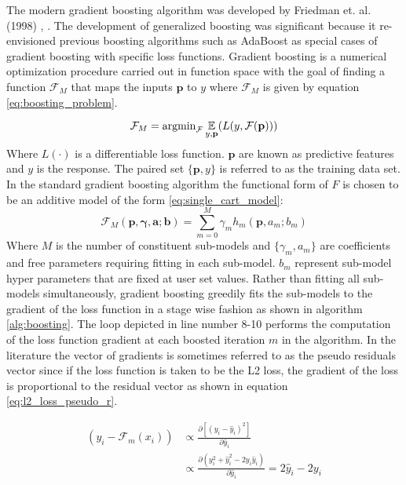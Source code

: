 The modern gradient boosting algorithm was developed by Friedman et. al. (1998) \cite{friedman1998}, \cite{friedman2001}.  The development of generalized boosting was significant because it re-envisioned previous boosting algorithms such as AdaBoost as special cases of gradient boosting with specific loss functions.  Gradient boosting is a numerical optimization procedure carried out in function space with the goal of finding a function $\mathcal F_M$ that maps the inputs $\mathbf p$ to $y$ where $\mathcal F_M$ is given by equation \ref{eq:boosting_problem}.

\begin{equation}
\mathcal F_M = \text{argmin}_{\mathcal F} \operatorname*{\mathbb{E}}_{y, \mathbf p} (L(y, \mathcal F(\mathbf p)))
\label{eq:boosting_problem}
\end{equation}
Where $L(\cdot)$ is a differentiable loss function.  $\mathbf p$ are known as predictive features and $y$ is the response.  The paired set $\{\mathbf p, y \}$ is referred to as the training data set.  In the standard gradient boosting algorithm the functional form of $F$ is chosen to be an additive model of the form \ref{eq:single_cart_model}:
\begin{equation}
\mathcal F_M(\mathbf p, \mathbf{\gamma}, \mathbf a; \mathbf b) = \sum_{m=0}^M \gamma_m h_m(\mathbf p, a_m; b_m)
\label{eq:single_cart_model}
\end{equation}
Where $M$ is the number of constituent sub-models and $\{\gamma_m, a_m\}$ are coefficients and free parameters requiring fitting in each sub-model.  $b_m$ represent sub-model hyper parameters that are fixed at user set values.
Rather than fitting all sub-models simultaneously,
gradient boosting greedily fits the sub-models to the gradient of the loss function in a stage wise fashion as shown in algorithm \ref{alg:boosting}.  The loop depicted in line number 8-10 performs the computation of the loss function gradient at each boosted iteration $m$ in the algorithm.  In the literature the vector of gradients is sometimes referred to as the pseudo residuals vector since if the loss function is taken to be the L2 loss, the gradient of the loss is proportional to the residual vector as shown in equation \ref{eq:l2_loss_pseudo_r}.

\begin{align}
    (y_i - \mathcal F_{m}(x_i)) & \propto \frac{\partial [(y_i - \hat y_i)^2]}{\partial \hat y_i} \nonumber \\
     & \propto \frac{\partial (y_i^2 + \hat y_i^2 - 2y_i \hat y_i)}{\partial \hat y_i} = 2 \hat y_i - 2 y_i
    \label{eq:l2_loss_pseudo_r}
\end{align}


